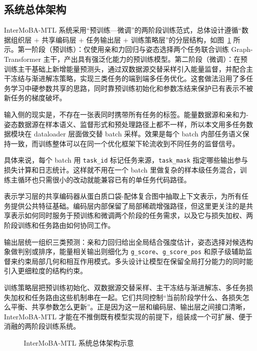 \subsection{系统总体架构}

InterMoBA-MTL 系统采用“预训练—微调”的两阶段训练范式，总体设计遵循“数据组织层 + 共享编码层 + 任务输出层 + 训练策略层”的分层结构，如图~\ref{F.system_architecture} 所示。第一阶段（预训练）：仅使用亲和力回归与姿态选择两个任务联合训练 Graph-Transformer 主干，产出具有强泛化能力的预训练模型。第二阶段（微调）：在预训练主干基础上新增能量预测头，通过双数据源交替采样引入能量监督，并配合主干冻结与渐进解冻策略，实现三类任务的端到端多任务优化。这套做法沿用了多任务学习中硬参数共享的思路\cite{caruana1997multitask,ruder2017overview}，同时靠预训练初始化和参数冻结来保护已有表示不被新任务的梯度破坏。

输入侧的现实是，不存在一张表同时携带所有任务的标签。能量数据源和亲和力-姿态数据源在样本语义、监督形式和预处理路径上都不一样，所以本文用多任务数据模块在 dataloader 层面做交替 batch 采样。效果是每个 batch 内部任务语义保持一致，而训练整体可以在同一个优化框架下轮流收到不同任务的监督信号。

具体来说，每个 batch 用 \texttt{task\_id} 标记任务来源，\texttt{task\_mask} 指定哪些输出参与损失计算和日志统计。这样就不用在一个 batch 里做复杂的样本级任务混合，训练主循环也只需很小的改动就能兼容已有的单任务代码路径。

表示学习层的共享编码器从蛋白质口袋-配体复合图中抽取上下文表示，为所有任务提供公共特征基础。编码层内部保留了局部稀疏增强路径，但这里更关注的是共享表示如何同时服务于预训练和微调两个阶段的任务需求，以及它与损失加权、两阶段训练和任务路由如何协同工作。

输出层统一组织三类预测：亲和力回归给出全局结合强度估计，姿态选择对候选构象做判别或排序，能量相关输出则细化为 \texttt{g\_score}、\texttt{g\_score\_pos} 和原子级辅助监督来约束局部几何和相互作用模式。多头设计让模型在保留全局打分能力的同时能引入更细粒度的结构约束。

训练策略层把预训练初始化、双数据源交替采样、主干冻结与渐进解冻、多任务损失加权和任务路由这些机制串在一起。它们共同控制“当前阶段学什么、各损失怎么平衡、共享参数怎么更新”。正是因为这一层和编码层、输出层之间接口清晰，InterMoBA-MTL 才能在不推倒既有模型实现的前提下，组装成一个可扩展、便于消融的两阶段训练系统。

\begin{figure}[hbt]
  \centering
  \resizebox{0.95\textwidth}{!}{}
  \caption{InterMoBA-MTL 系统总体架构示意}
  \label{F.system_architecture}
\end{figure}

